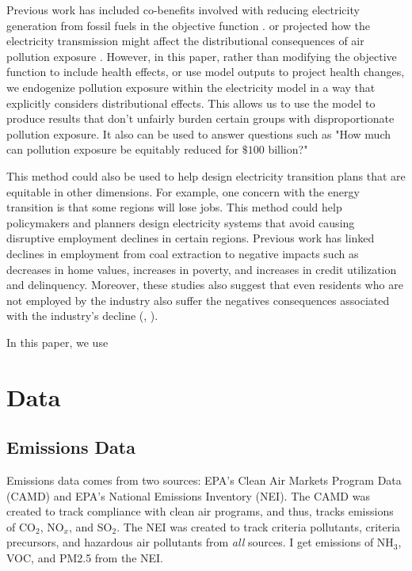 \documentclass[a4paper]{article}
\theoremstyle{definition}
\theoremstyle{plain}
\begin{document}
Previous work has included co-benefits involved with reducing electricity generation from fossil fuels in the objective function \citet{Sergi2020OptimizingBenefits}.
or projected how the electricity transmission might affect the distributional consequences of air pollution exposure \citep{Goforth2022AirStrategies}. However, in this paper, rather than modifying the objective function to include health effects, or use model outputs to project health changes, we endogenize pollution exposure within the electricity model in a way that explicitly considers distributional effects.  This allows us to use the model to produce results that don't unfairly burden certain groups with disproportionate pollution exposure.  It also can be used to answer questions such as "How much can pollution exposure be equitably reduced for $\$100$ billion?" 

This method could also be used to help design electricity transition plans that are equitable in other dimensions.  For example, one concern with the energy transition is that some regions will lose jobs.  This method could help policymakers and planners design electricity systems that avoid causing disruptive employment declines in certain regions. Previous work has linked declines in employment from  coal extraction to negative impacts such as decreases in home values, increases in poverty, and increases in credit utilization and delinquency. Moreover, these studies also suggest that even residents who are not employed by the industry also suffer the negatives consequences associated with the industry's decline (\citet{Kraynak2023TheCountry}, \citet{Blonz2023TheFuels}). 

In this paper, we use

\section{Data}
\subsection{Emissions Data}
Emissions data comes from two sources: EPA's Clean Air Markets Program Data (CAMD) and EPA's National Emissions Inventory (NEI).  The CAMD was created to track compliance with clean air programs, and thus, tracks emissions of CO$_2$, NO$_x$, and SO$_2$.  The NEI was created to track criteria pollutants, criteria precursors, and hazardous air pollutants from \textit{all} sources.  I get emissions of NH$_3$, VOC, and PM2.5 from the NEI. 
\end{document}
